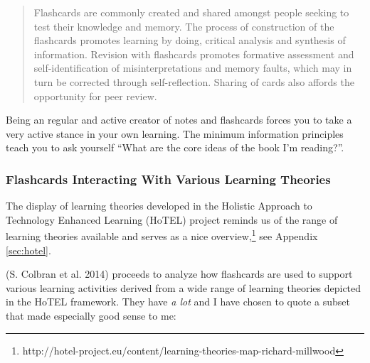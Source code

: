 \begin{quote}
Flashcards are commonly created and shared amongst people seeking to
test their knowledge and memory. The process of construction of the
flashcards promotes learning by doing, critical analysis and synthesis
of information. Revision with flashcards promotes formative assessment
and self-identification of misinterpretations and memory faults, which
may in turn be corrected through self-reflection. Sharing of cards also
affords the opportunity for peer review.
\end{quote}

Being an regular and active creator of notes and flashcards forces you
to take a very active stance in your own learning. The minimum
information principles teach you to ask yourself ``What are the core
ideas of the book I'm reading?''.

\subsubsection{Flashcards Interacting With Various Learning
Theories}\label{flashcards-interacting-with-various-learning-theories}

The display of learning theories developed in the Holistic Approach to
Technology Enhanced Learning (HoTEL) project reminds us of the range of
learning theories available and serves as a nice overview,\footnote{http://hotel-project.eu/content/learning-theories-map-richard-millwood}
see Appendix \ref{sec:hotel}.

(S. Colbran et al. 2014) proceeds to analyze how flashcards are used to
support various learning activities derived from a wide range of
learning theories depicted in the HoTEL framework. They have \emph{a
lot} and I have chosen to quote a subset that made especially good sense
to me:

